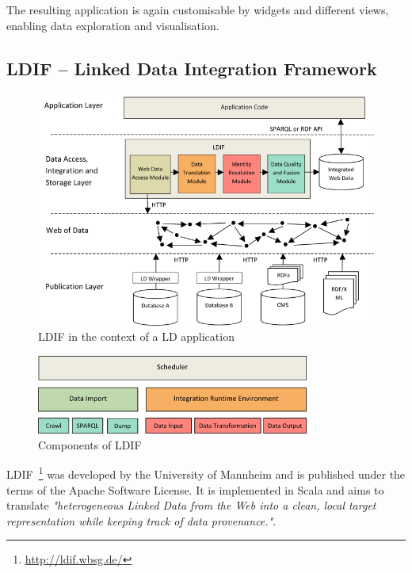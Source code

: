 The resulting application is again customisable by widgets and different views, enabling data exploration and visualisation.

\subsection{LDIF – Linked Data Integration Framework}

\begin{figure}[htbp]
	\centering
\includegraphics[width=\textwidth]{img/ldif_context.png}
	\caption{LDIF in the context of a LD application}
	\label{ldif_context}
\end{figure}

\begin{figure}[htbp]
	\centering
\includegraphics[width=0.8\textwidth]{img/ldif_components.png}
	\caption{Components of LDIF}
	\label{ldif_components}
\end{figure}


LDIF~\footnote{\url{http://ldif.wbsg.de/}} was developed by the University of Mannheim and is published under the terms of the Apache Software License. It is implemented in Scala and aims to translate \emph{"heterogeneous Linked Data from the Web into a clean, local target representation while keeping track of data provenance."}.


